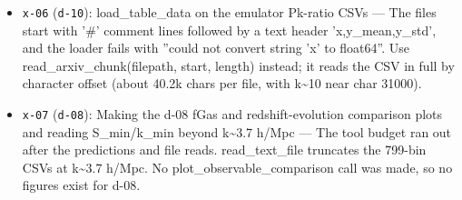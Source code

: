 \documentclass[11pt,a4paper]{article}
\begin{document}
\begin{itemize}
  \item \texttt{x-06} (\texttt{d-10}): load\_table\_data on the emulator Pk-ratio CSVs --- The files start with '\#' comment lines followed by a text header 'x,y\_mean,y\_std', and the loader fails with ''could not convert string 'x' to float64''. Use read\_arxiv\_chunk(filepath, start, length) instead; it reads the CSV in full by character offset (about 40.2k chars per file, with k\textasciitilde{}10 near char 31000).
  \item \texttt{x-07} (\texttt{d-08}): Making the d-08 fGas and redshift-evolution comparison plots and reading S\_min/k\_min beyond k\textasciitilde{}3.7 h/Mpc --- The tool budget ran out after the predictions and file reads. read\_text\_file truncates the 799-bin CSVs at k\textasciitilde{}3.7 h/Mpc. No plot\_observable\_comparison call was made, so no figures exist for d-08.
\end{itemize}
\end{document}
